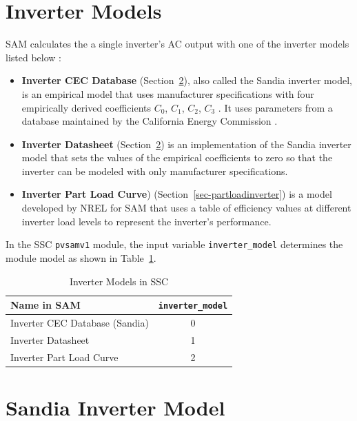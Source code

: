 \documentclass[12pt,letterpaper]{article}
\begin{document}
\section{Inverter Models}\label{sec-inverteroptions}

SAM calculates the a single inverter's AC output with one of the inverter models listed below \citep{blair2013}:

\begin{itemize}
\item \textbf{Inverter CEC Database} (Section~\ref{sec-sandiainverter}), also called the Sandia inverter model, is an empirical model that uses manufacturer specifications with four empirically derived coefficients $C_0$, $C_1$, $C_2$, $C_3$ \citep{king2007}. It uses parameters from a database maintained by the California Energy Commission \citep{gsc2014a}.
\item \textbf{Inverter Datasheet} (Section~\ref{sec-sandiainverter}) is an implementation of the Sandia inverter model that sets the values of the empirical coefficients to zero so that the inverter can be modeled with only manufacturer specifications.
\item \textbf{Inverter Part Load Curve}) (Section~\ref{sec-partloadinverter}) is a model developed by NREL for SAM that uses a table of efficiency values at different inverter load levels to represent the inverter's performance.
\end{itemize}

In the SSC \texttt{pvsamv1} module, the input variable \texttt{inverter\_model} determines the module model as shown in Table~\ref{tab-invertersubmodels}.

\begin{table}
\begin{center}
\caption{Inverter Models in SSC}
\begin{tabular}{lc}
\midrule
Name in SAM & \texttt{inverter\_model} \\
\midrule
Inverter CEC Database (Sandia) & 0 \\
Inverter Datasheet & 1 \\
Inverter Part Load Curve & 2 \\
\hline
\end{tabular}
\label{tab-invertersubmodels}
\end{center}
\end{table}

\section{Sandia Inverter Model}\label{sec-sandiainverter}
\end{document}
